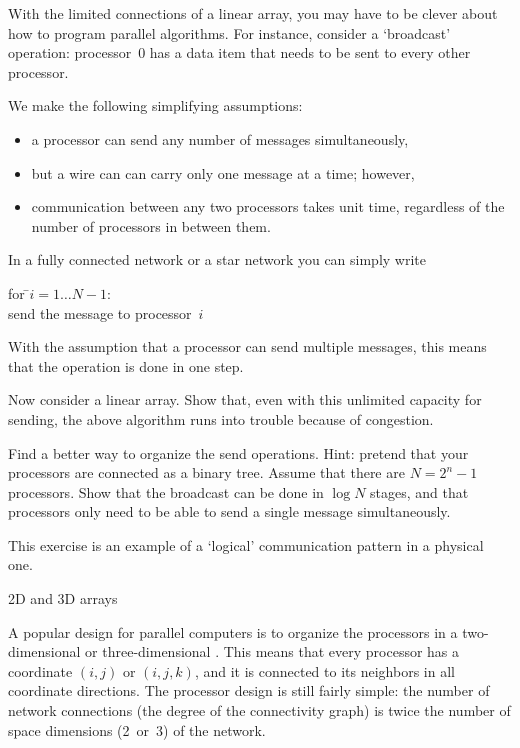 \begin{exercise}
  With the limited connections of a linear array, you may have to be
  clever about how to program parallel algorithms. For instance,
  consider a `broadcast' operation: processor~$0$ has a data item that
  needs to be sent to every other processor. 

  We make the following simplifying assumptions:
  \begin{itemize}
  \item a processor can send any number of messages simultaneously,
  \item but a wire can can carry only one message at a time; however,
    \item communication between any two processors takes unit time,
      regardless of the number of processors in between them.
  \end{itemize}

  In a fully connected network or a star network
  you can simply write
  \begin{tabbing}
    for \=$i=1\ldots N-1$:\\ \>send the message to processor~$i$
  \end{tabbing}
  With the assumption that a processor can send multiple messages,
  this means that the operation is done in one step.

  Now consider a linear array. Show that, even with this unlimited capacity for
  sending, the above algorithm runs into trouble because of congestion.

  Find a better way to organize the send operations. Hint: pretend
  that your processors are connected as a binary tree. Assume that
  there are $N=2^n-1$ processors.
  Show that the broadcast can be done in $\log N$ stages, and that
  processors only need to be able to send a single message simultaneously.
\end{exercise}
This exercise is an example of  a
`logical' communication pattern in a physical one.

 {2D and 3D arrays}

A popular design for parallel computers is to organize the processors
in a two-dimensional or three-dimensional .
This means that every processor has a coordinate $(i,j)$ or $(i,j,k)$,
and it is connected to its neighbors in all coordinate directions.
The processor design is still fairly simple: the number of network
connections (the degree of the connectivity graph) is twice the number
of space dimensions (2~or~3) of the network.

